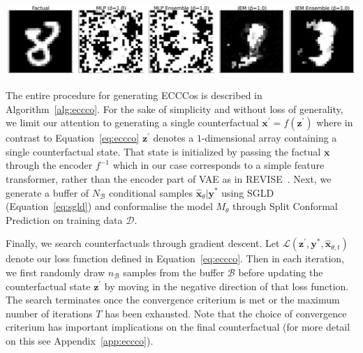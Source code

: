 \documentclass{article}
\begin{document}
\medskip

\begin{minipage}[c]{\textwidth}
  \includegraphics[width=\textwidth]{../artifacts/results/images/mnist_eccco.png}
  \label{fig:eccco-mnist}
\end{minipage}

\medskip

The entire procedure for generating ECCCos is described in Algorithm~\ref{alg:eccco}. For the sake of simplicity and without loss of generality, we limit our attention to generating a single counterfactual $\mathbf{x}^\prime=f(\mathbf{z}^\prime)$ where in contrast to Equation~\ref{eq:eccco} $\mathbf{z}^\prime$ denotes a $1$-dimensional array containing a single counterfactual state. That state is initialized by passing the factual $\mathbf{x}$ through the encoder $f^{-1}$ which in our case corresponds to a simple feature transformer, rather than the encoder part of VAE as in REVISE~\citep{joshi2019realistic}. Next, we generate a buffer of $N_{\mathcal{B}}$ conditional samples $\hat{\mathbf{x}}_{\theta}|\mathbf{y}^*$ using SGLD (Equation~\ref{eq:sgld}) and conformalise the model $M_{\theta}$ through Split Conformal Prediction on training data $\mathcal{D}$.

Finally, we search counterfactuals through gradient descent. Let $\mathcal{L}(\mathbf{z}^\prime,\mathbf{y}^*,\hat{\mathbf{x}}_{\theta, t})$ denote our loss function defined in Equation~\ref{eq:eccco}. Then in each iteration, we first randomly draw $n_{\mathcal{B}}$ samples from the buffer $\mathcal{B}$ before updating the counterfactual state $\mathbf{z}^\prime$ by moving in the negative direction of that loss function. The search terminates once the convergence criterium is met or the maximum number of iterations $T$ has been exhausted. Note that the choice of convergence criterium has important implications on the final counterfactual (for more detail on this see Appendix~\ref{app:eccco}).
\end{document}
